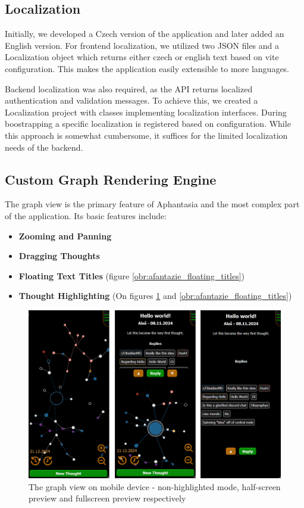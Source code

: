 \subsection{Localization}
Initially, we developed a Czech version of the application and later added an English version.
For frontend \gls{localization}, we utilized two JSON files and a Localization object which returns 
either czech or english text based on \gls{vite} configuration.
This makes the application easily extensible to more languages.

Backend localization was also required, as the API returns localized authentication and validation messages.
To achieve this, we created a Localization project with classes implementing localization interfaces.
During boostrapping a specific localization is registered based on configuration. 
While this approach is somewhat cumbersome, it suffices for the limited localization needs of the backend.

\subsection{Custom Graph Rendering Engine}

The graph view is the primary feature of Aphantasia and the most complex part of the application.
Its basic features include:
\begin{itemize}
\item \textbf{Zooming and Panning}
\item \textbf{Dragging Thoughts}
\item \textbf{Floating Text Titles} (figure \ref{obr:afantazie_floating_titles})
\item \textbf{Thought Highlighting} (On figures \ref{obr:afantazie_mobile_graph_view} and \ref{obr:afantazie_floating_titles})
\end{itemize}

\begin{figure}[p]
    \includegraphics[width=130mm, keepaspectratio]{img/afantazie_mobile_graph_view.png}
    \caption{The graph view on mobile device - non-highlighted mode, half-screen preview and fullscreen preview respectively}
    \label{obr:afantazie_mobile_graph_view}
\end{figure}


